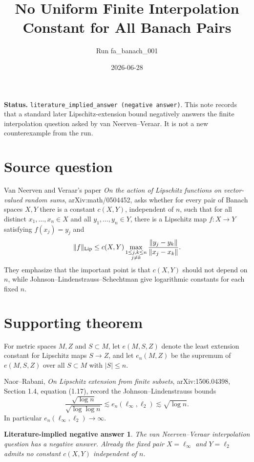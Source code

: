 \documentclass[11pt]{amsart}
\newtheorem*{theorem*}{Literature-implied negative answer}
\begin{document}
\title{No Uniform Finite Interpolation Constant for All Banach Pairs}
\author{Run fa\_banach\_001}
\date{2026-06-28}
\maketitle

\noindent
\textbf{Status.} \texttt{literature\_implied\_answer (negative answer)}.
This note records that a standard later Lipschitz-extension bound negatively
answers the finite interpolation question asked by van Neerven--Veraar.
It is not a new counterexample from the run.

\section*{Source question}

Van Neerven and Veraar's paper
\emph{On the action of Lipschitz functions on vector-valued random sums},
arXiv:math/0504452, asks whether for every pair of Banach spaces \(X,Y\)
there is a constant \(c(X,Y)\), independent of \(n\), such that for all
distinct \(x_1,\ldots,x_n\in X\) and all \(y_1,\ldots,y_n\in Y\), there is a
Lipschitz map \(f:X\to Y\) satisfying \(f(x_j)=y_j\) and
\[
  \|f\|_{\rm Lip}\le c(X,Y)
  \max_{\substack{1\le j,k\le n\\j\ne k}}
  \frac{\|y_j-y_k\|}{\|x_j-x_k\|}.
\]
They emphasize that the important point is that \(c(X,Y)\) should not depend
on \(n\), while Johnson--Lindenstrauss--Schechtman give logarithmic constants
for each fixed \(n\).

\section*{Supporting theorem}

For metric spaces \(M,Z\) and \(S\subset M\), let \(e(M,S,Z)\) denote the
least extension constant for Lipschitz maps \(S\to Z\), and let \(e_n(M,Z)\)
be the supremum of \(e(M,S,Z)\) over all \(S\subset M\) with \(|S|\le n\).

Naor--Rabani, \emph{On Lipschitz extension from finite subsets},
arXiv:1506.04398, Section 1.4, equation (1.17), record the
Johnson--Lindenstrauss bounds
\[
  \frac{\sqrt{\log n}}{\sqrt{\log\log n}}
  \lesssim e_n(\ell_\infty,\ell_2)
  \lesssim \sqrt{\log n}.
\]
In particular \(e_n(\ell_\infty,\ell_2)\to\infty\).

\begin{theorem*}
The van Neerven--Veraar interpolation question has a negative answer. Already
the fixed pair \(X=\ell_\infty\) and \(Y=\ell_2\) admits no constant
\(c(X,Y)\) independent of \(n\).
\end{theorem*}
\end{document}
